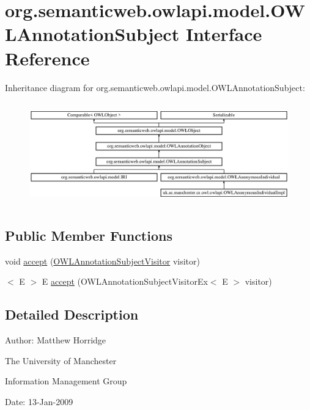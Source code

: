 \hypertarget{interfaceorg_1_1semanticweb_1_1owlapi_1_1model_1_1_o_w_l_annotation_subject}{\section{org.\-semanticweb.\-owlapi.\-model.\-O\-W\-L\-Annotation\-Subject Interface Reference}
\label{interfaceorg_1_1semanticweb_1_1owlapi_1_1model_1_1_o_w_l_annotation_subject}
}
Inheritance diagram for org.\-semanticweb.\-owlapi.\-model.\-O\-W\-L\-Annotation\-Subject\-:\begin{figure}[H]
\begin{center}
\leavevmode
\includegraphics[height=4.491979cm]{interfaceorg_1_1semanticweb_1_1owlapi_1_1model_1_1_o_w_l_annotation_subject}
\end{center}
\end{figure}
\subsection*{Public Member Functions}
\begin{DoxyCompactItemize}
\item 
void \hyperlink{interfaceorg_1_1semanticweb_1_1owlapi_1_1model_1_1_o_w_l_annotation_subject_ad4f51a9c19f39ce44fa51b61f341d248}{accept} (\hyperlink{interfaceorg_1_1semanticweb_1_1owlapi_1_1model_1_1_o_w_l_annotation_subject_visitor}{O\-W\-L\-Annotation\-Subject\-Visitor} visitor)
\item 
$<$ E $>$ E \hyperlink{interfaceorg_1_1semanticweb_1_1owlapi_1_1model_1_1_o_w_l_annotation_subject_af2cc452e3cf8121b7d2b85e59b0fd797}{accept} (O\-W\-L\-Annotation\-Subject\-Visitor\-Ex$<$ E $>$ visitor)
\end{DoxyCompactItemize}


\subsection{Detailed Description}
Author\-: Matthew Horridge\par
 The University of Manchester\par
 Information Management Group\par
 Date\-: 13-\/\-Jan-\/2009 

